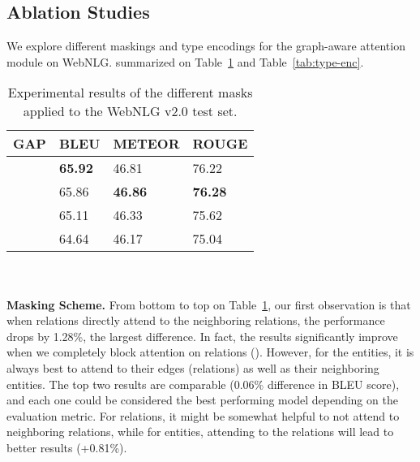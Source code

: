 \documentclass[11pt]{article}
\begin{document}
\subsection{Ablation Studies}
We explore different maskings and type encodings for the graph-aware attention module on WebNLG. summarized on Table~\ref{tab:q-k choices} and Table~\ref{tab:type-enc}.
\begin{table}[]
\centering
\begin{tabular}{llll}
\hline
GAP & BLEU  & METEOR & ROUGE\\ \hline
   & \textbf{65.92} & 46.81  & 76.22\\ \hline
   & 65.86 & \textbf{46.86}  & \textbf{76.28}\\ \hline
   & 65.11 & 46.33  & 75.62\\ \hline
   & 64.64 & 46.17  & 75.04\\ \hline
\end{tabular}
\caption{\label{tab:q-k choices} Experimental results of the different masks applied to the WebNLG v2.0 test set.}
\end{table}
\\\\
\textbf{Masking Scheme.} From bottom to top on Table~\ref{tab:q-k choices}, our first observation is that when relations directly attend to the neighboring relations, the performance drops by 1.28\%, the largest difference. In fact, the results significantly improve when we completely block attention on relations (). However, for the entities, it is always best to attend to their edges (relations) as well as their neighboring entities. The top two results are comparable (0.06\% difference in BLEU score), and each one could be considered the best performing model depending on the evaluation metric. For relations, it might be somewhat helpful to not attend to neighboring relations, while for entities, attending to the relations will lead to better results (+0.81\%).
\end{document}
